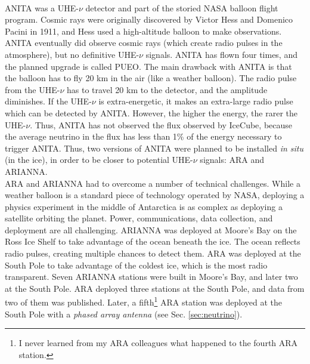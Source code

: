 \documentclass[../../../main.tex]{subfiles}
\begin{document}
\\
\vspace{0.15cm}
ANITA was a UHE-$\nu$ detector and part of the storied NASA balloon flight program.  Cosmic rays were originally discovered by Victor Hess and Domenico Pacini in 1911, and Hess used a high-altitude balloon to make observations.  ANITA eventually did observe cosmic rays (which create radio pulses in the atmosphere), but no definitive UHE-$\nu$ signals.  ANITA has flown four times, and the planned upgrade is called PUEO.  The main drawback with ANITA is that the balloon has to fly 20 km in the air (like a weather balloon).  The radio pulse from the UHE-$\nu$ has to travel 20 km to the detector, and the amplitude diminishes.  If the UHE-$\nu$ is extra-energetic, it makes an extra-large radio pulse which can be detected by ANITA.  However, the higher the energy, the rarer the UHE-$\nu$.  Thus, ANITA has not observed the flux observed by IceCube, because the average neutrino in the flux has less than 1\% of the energy necessary to trigger ANITA.  Thus, two versions of ANITA were planned to be installed \textit{in situ} (in the ice), in order to be closer to potential UHE-$\nu$ signals: ARA and ARIANNA.
\\
\vspace{0.15cm}
ARA and ARIANNA had to overcome a number of technical challenges.  While a weather balloon is a standard piece of technology operated by NASA, deploying a physics experiment in the middle of Antarctica is as complex as deploying a satellite orbiting the planet.  Power, communications, data collection, and deployment are all challenging.  ARIANNA was deployed at Moore's Bay on the Ross Ice Shelf to take advantage of the ocean beneath the ice.  The ocean reflects radio pulses, creating multiple chances to detect them.  ARA was deployed at the South Pole to take advantage of the coldest ice, which is the most radio transparent.  Seven ARIANNA stations were built in Moore's Bay, and later two at the South Pole.  ARA deployed three stations at the South Pole, and data from two of them was published.  Later, a fifth\footnote{I never learned from my ARA colleagues what happened to the fourth ARA station.} ARA station was deployed at the South Pole with a \textit{phased array antenna} (see Sec. \ref{sec:neutrino}).
\\
\vspace{0.15cm}
\end{document}
